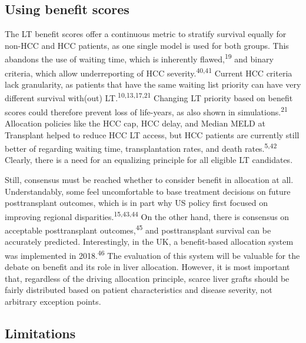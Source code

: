 \documentclass[11pt,english,]{book} %
\begin{document}
\hypertarget{using-benefit-scores}{%
\subsection*{Using benefit scores}\label{using-benefit-scores}}

The LT benefit scores offer a continuous metric to stratify survival equally for non-HCC and HCC patients, as one single model is used for both groups. This abandons the use of waiting time, which is inherently flawed,\textsuperscript{19} and binary criteria, which allow underreporting of HCC severity.\textsuperscript{40,41} Current HCC criteria lack granularity, as patients that have the same waiting list priority can have very different survival with(out) LT.\textsuperscript{10,13,17,21} Changing LT priority based on benefit scores could therefore prevent loss of life-years, as also shown in simulations.\textsuperscript{21} Allocation policies like the HCC cap, HCC delay, and Median MELD at Transplant helped to reduce HCC LT access, but HCC patients are currently still better of regarding waiting time, transplantation rates, and death rates.\textsuperscript{5,42} Clearly, there is a need for an equalizing principle for all eligible LT candidates.

Still, consensus must be reached whether to consider benefit in allocation at all. Understandably, some feel uncomfortable to base treatment decisions on future posttransplant outcomes, which is in part why US policy first focused on improving regional disparities.\textsuperscript{15,43,44} On the other hand, there is consensus on acceptable posttransplant outcomes,\textsuperscript{45} and posttransplant survival can be accurately predicted. Interestingly, in the UK, a benefit-based allocation system was implemented in 2018.\textsuperscript{46} The evaluation of this system will be valuable for the debate on benefit and its role in liver allocation. However, it is most important that, regardless of the driving allocation principle, scarce liver grafts should be fairly distributed based on patient characteristics and disease severity, not arbitrary exception points.

\hypertarget{limitations-4}{%
\subsection*{Limitations}\label{limitations-4}}
\end{document}
